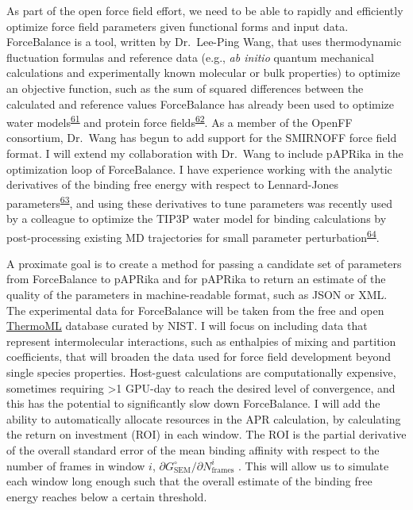 \documentclass[11pt,notitlepage]{article}
\begin{document}
As part of the open force field effort, we need to be able to rapidly
and efficiently optimize force field parameters given functional forms
and input data. ForceBalance is a tool, written by Dr.~Lee-Ping Wang,
that uses thermodynamic fluctuation formulas and reference data (e.g.,
\emph{ab initio} quantum mechanical calculations and experimentally
known molecular or bulk properties) to optimize an objective function,
such as the sum of squared differences between the calculated and
reference values ForceBalance has already been used to optimize water
models\textsuperscript{\protect\hyperlink{ref-50lAQZra}{61}} and protein
force fields\textsuperscript{\protect\hyperlink{ref-1E3wArY0j}{62}}. As
a member of the OpenFF consortium, Dr.~Wang has begun to add support for
the SMIRNOFF force field format. I will extend my collaboration with
Dr.~Wang to include pAPRika in the optimization loop of ForceBalance. I
have experience working with the analytic derivatives of the binding
free energy with respect to Lennard-Jones
parameters\textsuperscript{\protect\hyperlink{ref-xRauI5mb}{63}}, and
using these derivatives to tune parameters was recently used by a
colleague to optimize the TIP3P water model for binding calculations by
post-processing existing MD trajectories for small parameter
perturbation\textsuperscript{\protect\hyperlink{ref-NeqIQDLp}{64}}.

A proximate goal is to create a method for passing a candidate set of
parameters from ForceBalance to pAPRika and for pAPRika to return an
estimate of the quality of the parameters in machine-readable format,
such as JSON or XML. The experimental data for ForceBalance will be
taken from the free and open
\href{https://www.nist.gov/mml/acmd/trc/thermoml}{ThermoML} database
curated by NIST. I will focus on including data that represent
intermolecular interactions, such as enthalpies of mixing and partition
coefficients, that will broaden the data used for force field
development beyond single species properties. Host-guest calculations
are computationally expensive, sometimes requiring \textgreater{}1
GPU-day to reach the desired level of convergence, and this has the
potential to significantly slow down ForceBalance. I will add the
ability to automatically allocate resources in the APR calculation, by
calculating the return on investment (ROI) in each window. The ROI is
the partial derivative of the overall standard error of the mean binding
affinity with respect to the number of frames in window \(i\),
\(\partial G^\circ_\text{SEM} / \partial N^i_\text{frames}\) . This will
allow us to simulate each window long enough such that the overall
estimate of the binding free energy reaches below a certain threshold.
\end{document}
